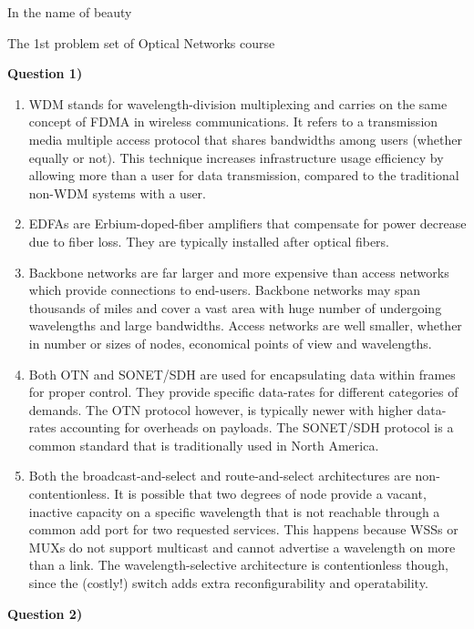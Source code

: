 \documentclass[10pt,letterpaper]{article}
\newcommand{\Q}[1]{\textbf{Question #1)}}
\begin{document}
\Large
\begin{center}
In the name of beauty

The 1st problem set of Optical Networks course

\hrulefill
\end{center}
\Q1

\begin{enumerate}[label=\alph*)]
\item
WDM stands for wavelength-division multiplexing and carries on the same concept of FDMA in wireless communications. It refers to a transmission media multiple access protocol that shares bandwidths among users (whether equally or not). This technique increases infrastructure usage efficiency by allowing more than a user for data transmission, compared to the traditional non-WDM systems with a user.
\item
EDFAs are Erbium-doped-fiber amplifiers that compensate for power decrease due to fiber loss. They are typically installed after optical fibers.
\item
Backbone networks are far larger and more expensive than access networks which provide connections to end-users. Backbone networks may span thousands of miles and cover a vast area with huge number of undergoing wavelengths and large bandwidths. Access networks are well smaller, whether in number or sizes of nodes, economical points of view and wavelengths.
\item
Both OTN and SONET/SDH are used for encapsulating data within frames for proper control. They provide specific data-rates for different categories of demands. The OTN protocol however, is typically newer with higher data-rates accounting for overheads on payloads. The SONET/SDH protocol is a common standard that is traditionally used in North America.
\item
Both the broadcast-and-select and route-and-select architectures are non-contentionless. It is possible that two degrees of node provide a vacant, inactive capacity on a specific wavelength that is not reachable through a common add port for two requested services. This happens because WSSs or MUXs do not support multicast and cannot advertise a wavelength on more than a link. The wavelength-selective architecture is contentionless though, since the (costly!) switch adds extra reconfigurability and operatability.
\end{enumerate}

\Q2
\end{document}

